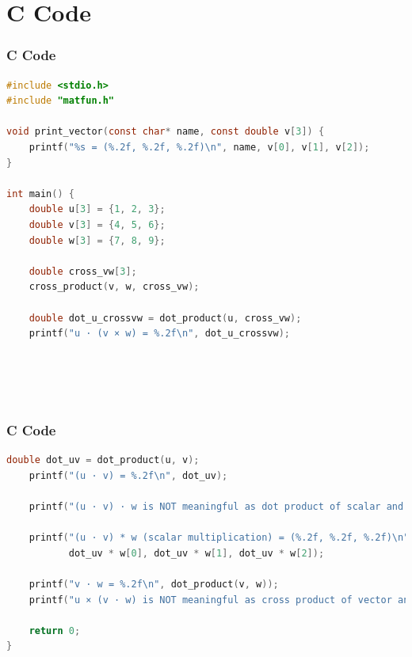 \documentclass{beamer}
\theoremstyle{remark}
\numberwithin{equation}{section}
\begin{document}
\section{ C Code}
\begin{frame}[fragile]
\frametitle{C Code }
\begin{lstlisting}[language=C]
#include <stdio.h>
#include "matfun.h"

void print_vector(const char* name, const double v[3]) {
    printf("%s = (%.2f, %.2f, %.2f)\n", name, v[0], v[1], v[2]);
}

int main() {
    double u[3] = {1, 2, 3};
    double v[3] = {4, 5, 6};
    double w[3] = {7, 8, 9};

    double cross_vw[3];
    cross_product(v, w, cross_vw);

    double dot_u_crossvw = dot_product(u, cross_vw);
    printf("u · (v × w) = %.2f\n", dot_u_crossvw);


   
    
\end{lstlisting}
\end{frame}
\begin{frame}[fragile]
\frametitle{C Code }
\begin{lstlisting}[language=C]
 double dot_uv = dot_product(u, v);
    printf("(u · v) = %.2f\n", dot_uv);

    printf("(u · v) · w is NOT meaningful as dot product of scalar and vector.\n");

    printf("(u · v) * w (scalar multiplication) = (%.2f, %.2f, %.2f)\n",
           dot_uv * w[0], dot_uv * w[1], dot_uv * w[2]);

    printf("v · w = %.2f\n", dot_product(v, w));
    printf("u × (v · w) is NOT meaningful as cross product of vector and scalar.\n");

    return 0;
}


\end{lstlisting}
\end{frame}
\end{document}
